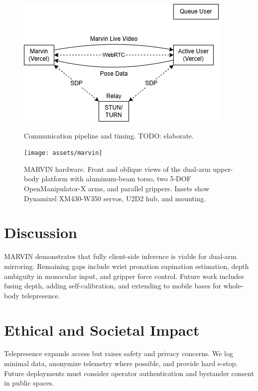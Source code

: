 \documentclass[sigconf]{acmart}
\begin{document}
\begin{figure}[htbp]
  \centering
  \includegraphics[width=\linewidth]{assets/system-diagram.png}
  \caption{Communication pipeline and timing. TODO: elaborate.} %
  \label{fig:pipeline}
\end{figure}

\begin{figure}[htbp]
  \centering
  \texttt{[image: assets/marvin]}
  \caption{MARVIN hardware. Front and oblique views of the dual-arm upper-body platform with aluminum-beam torso, two 5-DOF OpenManipulator-X arms, and parallel grippers. Insets show Dynamixel XM430-W350 servos, U2D2 hub, and mounting.}
  \label{fig:photos}
\end{figure}


\section{Discussion}
MARVIN demonstrates that fully client-side inference is viable for dual-arm mirroring. Remaining gaps include wrist pronation supination estimation, depth ambiguity in monocular input, and gripper force control. Future work includes fusing depth, adding self-calibration, and extending to mobile bases for whole-body telepresence.

\section{Ethical and Societal Impact}
Telepresence expands access but raises safety and privacy concerns. We log minimal data, anonymize telemetry where possible, and provide hard e-stop. Future deployments must consider operator authentication and bystander consent in public spaces.
\end{document}
